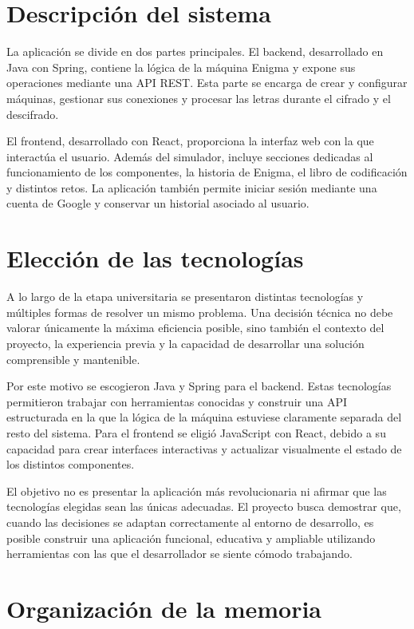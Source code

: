 \section{Descripción del sistema}

La aplicación se divide en dos partes principales. El backend, desarrollado en Java
con Spring, contiene la lógica de la máquina Enigma y expone sus operaciones mediante
una API REST. Esta parte se encarga de crear y configurar máquinas, gestionar sus
conexiones y procesar las letras durante el cifrado y el descifrado.

El frontend, desarrollado con React, proporciona la interfaz web con la que interactúa
el usuario. Además del simulador, incluye secciones dedicadas al funcionamiento de los
componentes, la historia de Enigma, el libro de codificación y distintos retos. La
aplicación también permite iniciar sesión mediante una cuenta de Google y conservar un
historial asociado al usuario.

\section{Elección de las tecnologías}

A lo largo de la etapa universitaria se presentaron distintas tecnologías y múltiples
formas de resolver un mismo problema. Una decisión técnica no debe valorar únicamente
la máxima eficiencia posible, sino también el contexto del proyecto, la experiencia
previa y la capacidad de desarrollar una solución comprensible y mantenible.

Por este motivo se escogieron Java y Spring para el backend. Estas tecnologías
permitieron trabajar con herramientas conocidas y construir una API estructurada en la
que la lógica de la máquina estuviese claramente separada del resto del sistema. Para
el frontend se eligió JavaScript con React, debido a su capacidad para crear interfaces
interactivas y actualizar visualmente el estado de los distintos componentes.

El objetivo no es presentar la aplicación más revolucionaria ni afirmar que las
tecnologías elegidas sean las únicas adecuadas. El proyecto busca demostrar que, cuando
las decisiones se adaptan correctamente al entorno de desarrollo, es posible construir
una aplicación funcional, educativa y ampliable utilizando herramientas con las que el
desarrollador se siente cómodo trabajando.

\section{Organización de la memoria}

